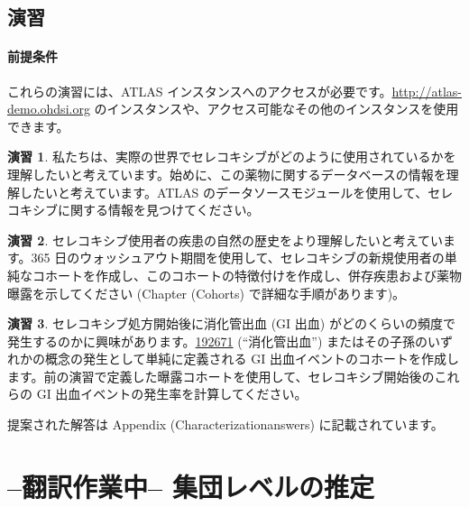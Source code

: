 \documentclass[
  11pt]{book}
\theoremstyle{definition}
\theoremstyle{definition}
\theoremstyle{definition}
\newtheorem{exercise}{演習}[chapter]
\theoremstyle{definition}
\theoremstyle{remark}
\begin{document}
\section{演習}\label{ux6f14ux7fd2-4}

\subsubsection*{前提条件}\label{ux524dux63d0ux6761ux4ef6-6}

これらの演習には、ATLAS インスタンスへのアクセスが必要です。\url{http://atlas-demo.ohdsi.org} のインスタンスや、アクセス可能なその他のインスタンスを使用できます。

\begin{exercise}
\protect\hypertarget{exr:exerciseCharacterization1}{}\label{exr:exerciseCharacterization1}私たちは、実際の世界でセレコキシブがどのように使用されているかを理解したいと考えています。始めに、この薬物に関するデータベースの情報を理解したいと考えています。ATLAS のデータソースモジュールを使用して、セレコキシブに関する情報を見つけてください。
\end{exercise}

\begin{exercise}
\protect\hypertarget{exr:exerciseCharacterization2}{}\label{exr:exerciseCharacterization2}セレコキシブ使用者の疾患の自然の歴史をより理解したいと考えています。365 日のウォッシュアウト期間を使用して、セレコキシブの新規使用者の単純なコホートを作成し、このコホートの特徴付けを作成し、併存疾患および薬物曝露を示してください (Chapter \citet{ref}(Cohorts) で詳細な手順があります)。
\end{exercise}

\begin{exercise}
\protect\hypertarget{exr:exerciseCharacterization3}{}\label{exr:exerciseCharacterization3}セレコキシブ処方開始後に消化管出血 (GI 出血) がどのくらいの頻度で発生するのかに興味があります。\href{http://athena.ohdsi.org/search-terms/terms/192671}{192671} (``消化管出血'') またはその子孫のいずれかの概念の発生として単純に定義される GI 出血イベントのコホートを作成します。前の演習で定義した曝露コホートを使用して、セレコキシブ開始後のこれらの GI 出血イベントの発生率を計算してください。
\end{exercise}

提案された解答は Appendix \citet{ref}(Characterizationanswers) に記載されています。

\chapter{--翻訳作業中-- 集団レベルの推定}\label{PopulationLevelEstimation}
\end{document}

